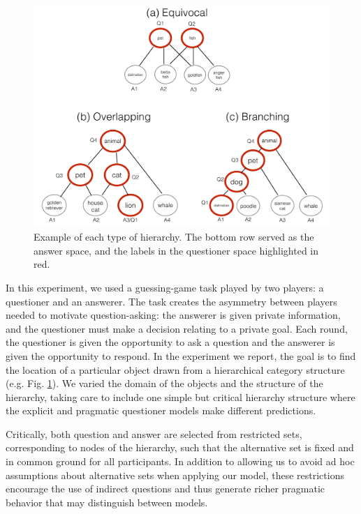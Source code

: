 \documentclass[12pt, floatsintext, jou]{apa6}
\begin{document}
\begin{figure}[t!]
\begin{center}
\includegraphics[scale = .3]{hierarchyStructureExamples}
\end{center}
\caption{Example of each type of hierarchy. The bottom row served as the answer space, and the labels in the questioner space highlighted in red.}
\label{fig:hierarchyStructures}
\end{figure}


In this experiment, we used a guessing-game task played by two players: a questioner and an answerer. The task creates the asymmetry between players needed to motivate question-asking: the answerer is given private information, and the questioner must make a decision relating to a private goal. Each round, the questioner is given the opportunity to ask a question and the answerer is given the opportunity to respond. In the experiment we report, the goal is to find the location of a particular object drawn from a hierarchical category structure (e.g. Fig. \ref{fig:hierarchyStructures}). We varied the domain of the objects and the structure of the hierarchy, taking care to include one simple but critical hierarchy structure where the explicit and pragmatic questioner models make different predictions.

Critically, both question and answer are selected from restricted sets, corresponding to nodes of the hierarchy, such that the alternative set is fixed and in common ground for all participants. In addition to allowing us to avoid ad hoc assumptions about alternative sets when applying our model, these restrictions encourage the use of indirect questions and thus generate richer pragmatic behavior that may distinguish between models. 
\end{document}
